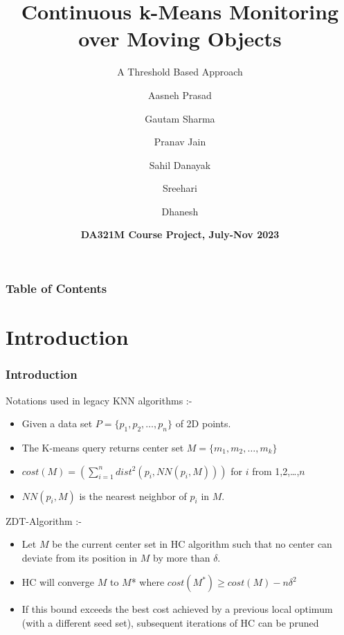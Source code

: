 \documentclass{beamer}
\title[Threshold Based \textit{K}-Means Monitoring] %
{Continuous k-Means Monitoring
over Moving Objects}
\subtitle{A Threshold Based Approach}
\author[Group 7] %
{Aasneh Prasad \and Gautam Sharma \and Pranav Jain \and Sahil Danayak \and Sreehari \and Dhanesh}
\date[16th November 2023] %
{\textbf{DA321M Course Project, July-Nov 2023}}
\begin{document}
\frame{\titlepage}


\begin{frame}
  \frametitle{Table of Contents}
  \tableofcontents
\end{frame}


\section{Introduction}
\begin{frame}
  \frametitle{Introduction}

  \vspace{-1mm}
  Notations used in legacy KNN algorithms :-
  \begin{itemize}
      \item Given a data set \(P = \{p_1, p_2, \ldots, p_n\}\) of 2D points.
      \item The K-means query returns center set  \(M = \{m_1, m_2, \ldots, m_k\}\)
      \item \(cost(M) = \left( \sum_{i=1}^{n} dist^2(p_i, NN(p_i, M)) \right)\) for \(i\) from 1,2,\ldots,\(n\)
      \item \(NN(p_i, M)\) is the nearest neighbor of \(p_i\) in \(M\).
  \end{itemize}
  \vspace{2mm}

  ZDT-Algorithm :-
  \begin{itemize}
      \item Let \(M\) be the current center set in HC algorithm such that no center can deviate from its position in \(M\) by more than \(\delta\).
      \item HC will converge \(M\) to \(M\)* where \(cost(M^*) \geq cost(M)-n\delta^2 \)
      \item If this bound exceeds the best cost achieved by a previous local optimum (with a different seed set), subsequent iterations of HC can be pruned
  \end{itemize}
\end{frame}
\end{document}

